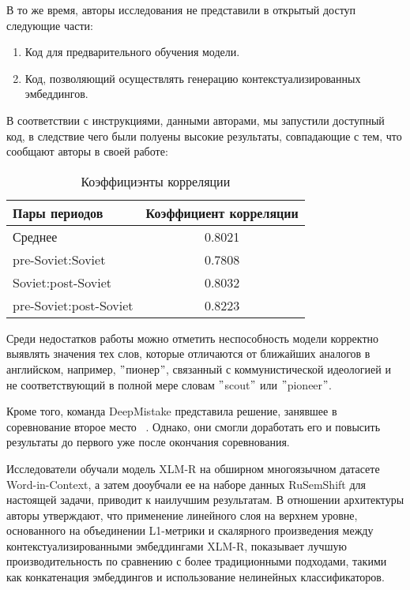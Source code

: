 \documentclass[LI,VKR]{HSEUniversity}
\begin{document}
В то же время, авторы исследования не представили в открытый доступ следующие части:
\begin{enumerate}
    \item Код для предварительного обучения модели.
    \item Код, позволяющий осуществлять генерацию контекстуализированных эмбеддингов.
\end{enumerate}

В соответствии с инструкциями, данными авторами, мы запустили доступный код,
в следствие чего были полуены высокие результаты, совпадающие с тем, что сообщают
авторы в своей работе:

\begin{table}[htbp]
\centering
\caption{Коэффициэнты корреляции}
\begin{tabular}{lc}
\hline
Пары периодов                  & Коэффициент корреляции \\
\hline
Среднее            & 0.8021                  \\
pre-Soviet:Soviet           & 0.7808                  \\
Soviet:post-Soviet          & 0.8032                  \\
pre-Soviet:post-Soviet      & 0.8223                  \\
\hline
\end{tabular}
\end{table}

Среди недостатков работы можно отметить неспособность модели корректно выявлять
значения тех слов, которые отличаются от ближайших аналогов в английском, например,
\("\)пионер\("\), связанный с коммунистической идеологией и не соответствующий в полной мере
словам \("\)scout\("\) или \("\)pioneer\("\).

Кроме того, команда DeepMistake представила решение, занявшее в соревнование второе место
~\cite{DeepMistake}.
Однако, они смогли доработать его и повысить результаты до первого уже после окончания
соревнования.

Исследователи обучали модель XLM-R на обширном многоязычном датасете Word-in-Context,
а затем дооубчали ее на наборе данных RuSemShift для настоящей задачи,
приводит к наилучшим результатам.
В отношении архитектуры авторы утверждают, что применение линейного слоя на верхнем уровне,
основанного на объединении L1-метрики и скалярного произведения между контекстуализированными
эмбеддингами XLM-R, показывает лучшую производительность по сравнению с
более традиционными подходами, такими как конкатенация эмбеддингов и
использование нелинейных классификаторов.
\end{document}
